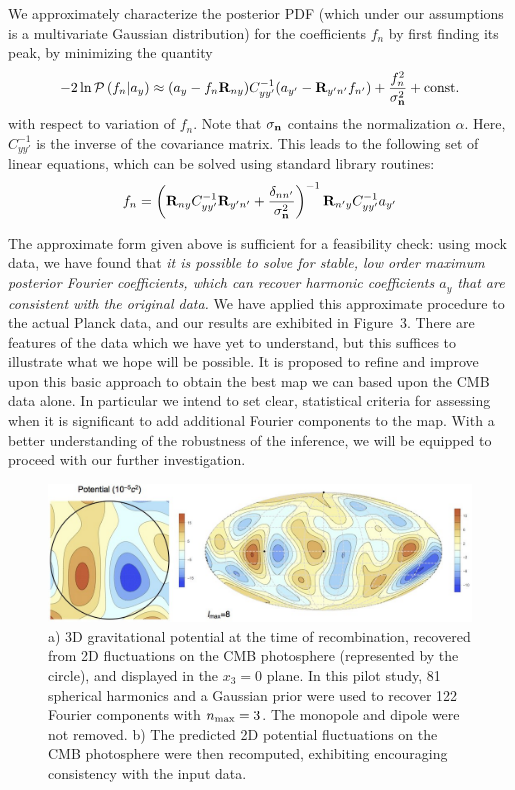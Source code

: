 \documentclass[psfig,12pt]{article}
\begin{document}
{We approximately characterize the posterior PDF (which under our
assumptions is a multivariate Gaussian distribution) for the
coefficients $f_n$ by first finding its peak, by minimizing the quantity
\begin{equation}
-2\ln{\cal P}\left(f_n|a_y\right) \approx (a_y- f_n\mathbf{R}_{ny})C_{yy'}^{-1}(a_{y'}-\mathbf{R}_{y'n'}f_{n'})+\frac{f_n^2}{\sigma_{{\bf n}}^2} + \mathrm{const.}
\end{equation}
with respect to variation of $f_n$. Note that $\sigma_{\bf n}$ contains
the normalization $\alpha$.
Here, $C_{yy'}^{-1}$ is the inverse
of the covariance matrix. This leads to the following set of
linear equations, which can be solved using standard library routines:
\begin{equation}
f_n=\left(\mathbf{R}_{ny}C_{yy'}^{-1}\mathbf{R}_{y'n'}+\frac{\delta_{nn'}}{\sigma_{\bf n}^2}\right)^{-1}\mathbf{R}_{n'y}C_{yy'}^{-1}a_{y'}
\end{equation}

The approximate form given above is sufficient for a feasibility check:
using mock data, we have found that {\it it is possible to solve for
stable, low order maximum posterior Fourier coefficients, which can
recover harmonic coefficients $a_y$ that are consistent with the
original data.} We have applied this approximate procedure to the
actual Planck data, and our results are exhibited in Figure~3. There are
features of the data which we have yet to understand, but this suffices
to illustrate what we hope will be possible. It is proposed to refine
and improve upon this basic approach to obtain the best map we can
based upon the CMB data alone. In particular we intend to set clear,
statistical criteria for assessing when it is significant to add
additional Fourier components to the map. With a better understanding of
the robustness of the inference, we will be equipped to proceed with
our further investigation.
\begin{figure}[t]
\centering\includegraphics[width=0.9\linewidth]{figures/nsffig3.jpg}
\caption{{\small a) 3D gravitational potential at the time
of recombination, recovered from 2D fluctuations on the CMB
photosphere (represented by the circle), and displayed in the
$x_3=0$ plane. In this pilot study, 81 spherical harmonics and a
Gaussian prior were used to recover 122 Fourier components with
$n_{\rm max}=3$. The monopole and dipole were not removed.   b) The
predicted 2D potential fluctuations on the CMB photosphere
were then recomputed,
exhibiting encouraging consistency with the input data.}}
\end{figure}

}
\end{document}
